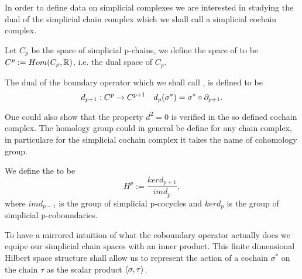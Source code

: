 \documentclass[../1.tex]{subfiles}
\begin{document}
    In order to define data on simplicial complexes we are interested in studying the dual of the simplicial chain complex
    which we shall call a  simplicial cochain complex.


    
    \begin{defn}
        Let $C_p$ be the space of simplicial p-chains, we define the space of  to 
        be $C^p := Hom(C_p, \mathbb{R})$, i.e. the dual space of $C_p$.
    \end{defn}

    \begin{defn}
        The dual of the boundary operator which we shall call
        , is defined to be 
        \[ d_{p+1} : C^p \to C^{p+1} \quad d_p(\sigma^*) = \sigma^* \circ \partial_{p+1} .\]
    \end{defn}

    One could also show that the property $d^2 = 0$ is verified in the so defined cochain complex.
    The homology group could in general be define for any chain complex, in particulare for the simplicial cochain
    complex it takes the name of cohomology group.

    \begin{defn}
        We define the  to be 
        \[H^p := \frac{ker d_{p+1}}{im d_{p}},\] 
        where $im d_{p-1}$ is the group of simplicial p-cocycles and
        $ker d_p$ is the group of simplicial p-coboundaries.
    \end{defn}

    To have a mirrored intuition of what the coboundary operator actually does we equipe our simplicial chain spaces with
    an inner product. This finite dimensional Hilbert space structure shall allow us to represent the action of a cochain $\sigma^*$ on the chain $\tau$ 
    as the scalar product $\langle \sigma, \tau \rangle$.
\end{document}
